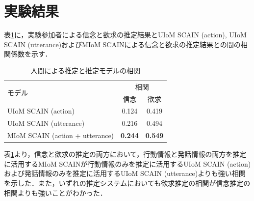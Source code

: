 \section{実験結果}

\par
表\ref{tab:cof}に，実験参加者による信念と欲求の推定結果とUIoM SCAIN (action), UIoM SCAIN (utterance)およびMIoM SCAINによる信念と欲求の推定結果との間の相関係数を示す．
\begin{table}[htb]
  \begin{center}
  \caption{人間による推定と推定モデルの相関}
  \label{tab:cof}
  \begin{tabular}{lcc} \hline
    \multirow{2}{*}{モデル}&\multicolumn{2}{c}{相関}\\\cline{2-3}
    & \hspace{10pt} 信念 \hspace{10pt} & \hspace{10pt} 欲求 \hspace{10pt} \\ \hline
    UIoM SCAIN (action)&0.124&0.419\\
    UIoM SCAIN (utterance)&0.216&0.494\\
    MIoM SCAIN (action + utterance)&\bf0.244&\bf0.549 \\\hline
  \end{tabular}
\end{center}
\end{table}


\par
表\ref{tab:cof}より，信念と欲求の推定の両方において，行動情報と発話情報の両方を推定に活用するMIoM SCAINが行動情報のみを推定に活用するUIoM SCAIN (action)および発話情報のみを推定に活用するUIoM SCAIN (utterance)よりも強い相関を示した．また，いずれの推定システムにおいても欲求推定の相関が信念推定の相関よりも強いことがわかった．
